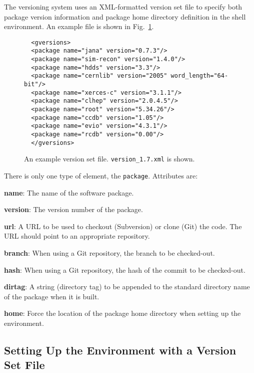 \documentclass[12pt, letterpaper]{article}
\begin{document}
The versioning system uses an XML-formatted version set file to specify
both package version information and package home directory definition
in the shell environment. An example file is shown in
Fig.~\ref{figure:version-xml}.

\begin{figure}
\begin{verbatim}
  <gversions>
  <package name="jana" version="0.7.3"/>
  <package name="sim-recon" version="1.4.0"/>
  <package name="hdds" version="3.3"/>
  <package name="cernlib" version="2005" word_length="64-bit"/>
  <package name="xerces-c" version="3.1.1"/>
  <package name="clhep" version="2.0.4.5"/>
  <package name="root" version="5.34.26"/>
  <package name="ccdb" version="1.05"/>
  <package name="evio" version="4.3.1"/>
  <package name="rcdb" version="0.00"/>
  </gversions>
\end{verbatim}
\caption{An example version set file. {\tt version\_1.7.xml} is shown.}\label{figure:version-xml}
\end{figure}

There is only one type of element, the {\tt package}. Attributes are:

\begin{description}
\item{\bf name}: The name of the software package.
\item{\bf version}: The version number of the package.
\item{\bf url}: A URL to be used to checkout (Subversion) or clone
  (Git) the code. The URL should point to an appropriate repository.
\item{\bf branch}: When using a Git repository, the branch to be
  checked-out.
\item{\bf hash}: When using a Git repository, the hash of the commit to be checked-out.
\item{\bf dirtag}: A string (directory tag) to be appended to the
  standard directory name of the package when it is built.
\item{\bf home}: Force the location of the package home directory when setting up the environment.
\end{description}

\subsection{Setting Up the Environment with a Version Set File}
\end{document}

